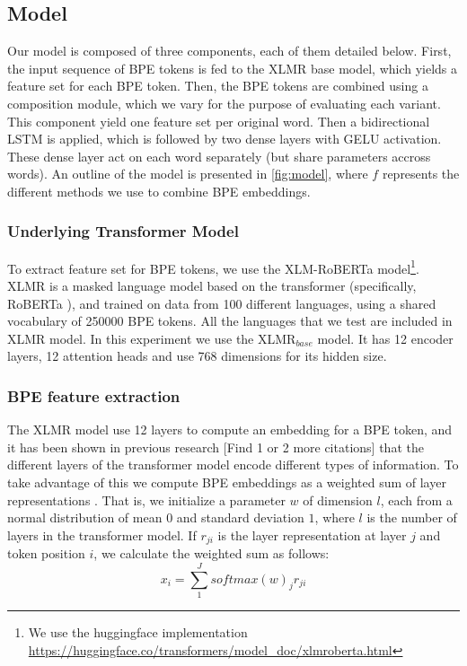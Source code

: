 \documentclass[11pt]{article}
\newcommand\citep{\cite}
\begin{document}
	\subsection{Model}

        Our model is composed of three components, each of them
        detailed below. First, the input sequence of BPE tokens is fed
        to the XLMR base model, which yields a feature set for each
        BPE token. Then, the BPE tokens are combined using a
        composition module, which we vary for the purpose of
        evaluating each variant. This component yield one feature set
        per original word. Then a bidirectional LSTM is applied, which
        is followed by two dense layers with GELU
        activation. These dense layer act on each word separately (but
        share parameters accross words).  An outline of the model is
        presented in \cref{fig:model}, where $f$ represents the
        different methods we use to combine BPE embeddings.

	\subsubsection{Underlying Transformer Model}
     To extract feature set for BPE tokens, we use the
     XLM-RoBERTa \cite{conneau2019unsupervised} model\footnote{We use the
     huggingface implementation
     \url{https://huggingface.co/transformers/model_doc/xlmroberta.html}}. XLMR
     is a masked language model based on the transformer
     (specifically, RoBERTa \cite{liu2019roberta}), and trained on
     data from 100 different languages, using a shared vocabulary of
     250000 BPE tokens. All the languages that we test are included in
     XLMR model. In this experiment we use the \textsc{XLMR}$_{base}$
     model. It has 12 encoder layers, 12 attention heads and use 768
     dimensions for its hidden size.
	

	\subsubsection{BPE feature extraction}
        \label{sec:bpe-features}


            The XLMR model use 12 layers to compute an embedding for a
     BPE token, and it has been shown in previous research
     \citep{kondratyukstraka,raganato2018analysis} [Find 1 or 2 more
     citations] that the different layers of the transformer model
     encode different types of information. To take advantage of this
     we compute BPE embeddings as a weighted sum of layer
     representations \citep{kondratyukstraka}.  That is, we initialize
     a parameter $w$ of dimension $l$, each from a normal distribution
     of mean $0$ and standard deviation $1$, where $l$ is the number
     of layers in the transformer model. If $r_{ji}$ is the layer
     representation at layer $j$ and token position $i$, we calculate
     the weighted sum as follows:
    \begin{equation}
		x_i = \sum_{1}^{J} softmax(w)_j r_{ji}
	\end{equation}
\end{document}
